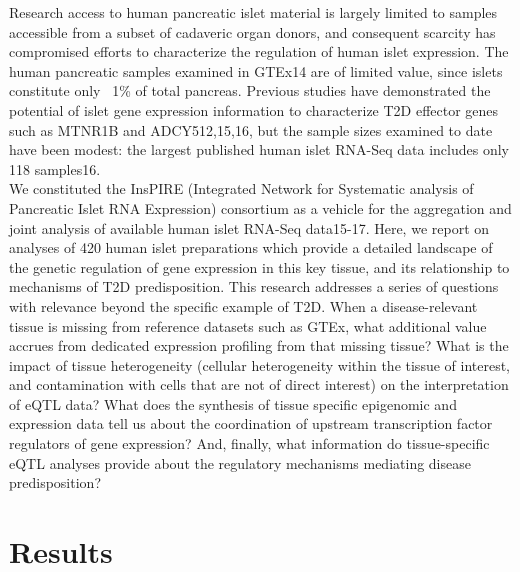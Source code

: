 Research access to human pancreatic islet material is largely limited to samples accessible from a subset of cadaveric organ donors, and consequent scarcity has compromised efforts to characterize the regulation of human islet expression. The human pancreatic samples examined in GTEx14 are of limited value, since islets constitute only ~1\% of total pancreas. Previous studies have demonstrated the potential of islet gene expression information to characterize T2D effector genes such as MTNR1B and ADCY512,15,16, but the sample sizes examined to date have been modest: the largest published human islet RNA-Seq data includes only 118 samples16. \\
    
We constituted the InsPIRE (Integrated Network for Systematic analysis of Pancreatic Islet RNA Expression) consortium as a vehicle for the aggregation and joint analysis of available human islet RNA-Seq data15-17. Here, we report on analyses of 420 human islet preparations which provide a detailed landscape of the genetic regulation of gene expression in this key tissue, and its relationship to mechanisms of T2D predisposition.
This research addresses a series of questions with relevance beyond the specific example of T2D. When a disease-relevant tissue is missing from reference datasets such as GTEx, what additional value accrues from dedicated expression profiling from that missing tissue? What is the impact of tissue heterogeneity (cellular heterogeneity within the tissue of interest, and contamination with cells that are not of direct interest) on the interpretation of eQTL data? What does the synthesis of tissue specific epigenomic and expression data tell us about the coordination of upstream transcription factor regulators of gene expression? And, finally, what information do tissue-specific eQTL analyses provide about the regulatory mechanisms mediating disease predisposition? 

\section{Results}
    
